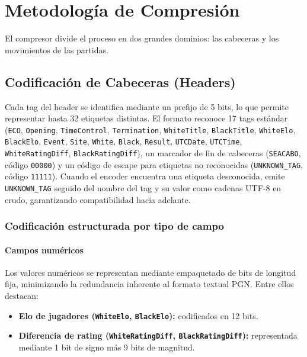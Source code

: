 \documentclass[11pt, letterpaper]{article}
\begin{document}
\section{Metodología de Compresión}

El compresor divide el proceso en dos grandes dominios: las cabeceras y los movimientos de las partidas.

\subsection{Codificación de Cabeceras (Headers)}

Cada tag del header se identifica mediante un prefijo de 5 bits, lo que permite representar hasta 32 etiquetas distintas. El formato reconoce 17 tags estándar (\texttt{ECO}, \texttt{Opening}, \texttt{TimeControl}, \texttt{Termination}, \texttt{WhiteTitle}, \texttt{BlackTitle}, \texttt{WhiteElo}, \texttt{BlackElo}, \texttt{Event}, \texttt{Site}, \texttt{White}, \texttt{Black}, \texttt{Result}, \texttt{UTCDate}, \texttt{UTCTime}, \texttt{WhiteRatingDiff}, \texttt{BlackRatingDiff}), un marcador de fin de cabeceras (\texttt{SEACABO}, código \texttt{00000}) y un código de escape para etiquetas no reconocidas (\texttt{UNKNOWN\_TAG}, código \texttt{11111}). Cuando el encoder encuentra una etiqueta desconocida, emite \texttt{UNKNOWN\_TAG} seguido del nombre del tag y su valor como cadenas UTF-8 en crudo, garantizando compatibilidad hacia adelante.

\subsubsection{Codificación estructurada por tipo de campo}

\paragraph{Campos numéricos}
Los valores numéricos se representan mediante empaquetado de bits de longitud fija, minimizando la redundancia inherente al formato textual PGN. Entre ellos destacan:

\begin{itemize}
    \item \textbf{Elo de jugadores (\texttt{WhiteElo}, \texttt{BlackElo}):} codificados en 12 bits.
    \item \textbf{Diferencia de rating (\texttt{WhiteRatingDiff}, \texttt{BlackRatingDiff}):} representada mediante 1 bit de signo más 9 bits de magnitud.
\end{itemize}
\end{document}
